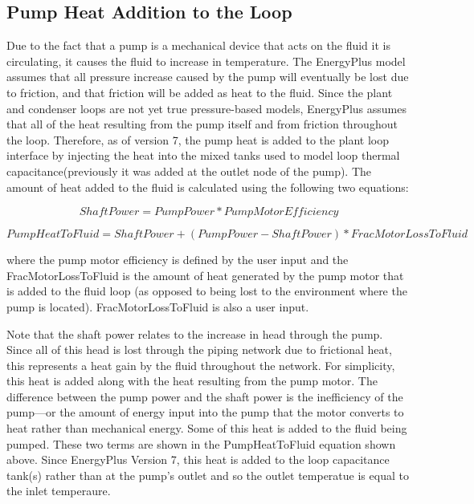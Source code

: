 \subsection{Pump Heat Addition to the Loop}\label{pump-heat-addition-to-the-loop}

Due to the fact that a pump is a mechanical device that acts on the fluid it is circulating, it causes the fluid to increase in temperature. The EnergyPlus model assumes that all pressure increase caused by the pump will eventually be lost due to friction, and that friction will be added as heat to the fluid. Since the plant and condenser loops are not yet true pressure-based models, EnergyPlus assumes that all of the heat resulting from the pump itself and from friction throughout the loop. Therefore, as of version 7, the pump heat is added to the plant loop interface by injecting the heat into the mixed tanks used to model loop thermal capacitance(previously it was added at the outlet node of the pump). The amount of heat added to the fluid is calculated using the following two equations:

\begin{equation}
ShaftPower = PumpPower * PumpMotorEfficiency
\end{equation}

\begin{equation}
PumpHeatToFluid = ShaftPower + \left( {PumpPower - ShaftPower} \right) * FracMotorLossToFluid
\end{equation}

where the pump motor efficiency is defined by the user input and the FracMotorLossToFluid is the amount of heat generated by the pump motor that is added to the fluid loop (as opposed to being lost to the environment where the pump is located). FracMotorLossToFluid is also a user input.

Note that the shaft power relates to the increase in head through the pump. Since all of this head is lost through the piping network due to frictional heat, this represents a heat gain by the fluid throughout the network. For simplicity, this heat is added along with the heat resulting from the pump motor. The difference between the pump power and the shaft power is the inefficiency of the pump---or the amount of energy input into the pump that the motor converts to heat rather than mechanical energy. Some of this heat is added to the fluid being pumped. These two terms are shown in the PumpHeatToFluid equation shown above. Since EnergyPlus Version 7, this heat is added to the loop capacitance tank(s) rather than at the pump's outlet and so the outlet temperatue is equal to the inlet temperaure.

